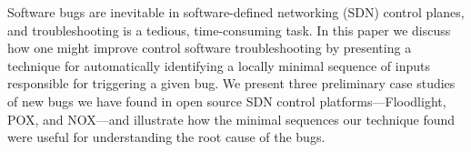 Software bugs are inevitable in software-defined networking (SDN) control planes,
and troubleshooting
is a tedious, time-consuming task.
In this paper we discuss how one might improve
control software troubleshooting by presenting a technique
for automatically identifying
a locally minimal sequence of inputs responsible for triggering a given bug.
We present three preliminary case studies of new bugs we have found in open source SDN control
platforms---Floodlight, POX, and NOX---and
illustrate how the minimal sequences our technique found were useful for
understanding the root cause of the bugs.
